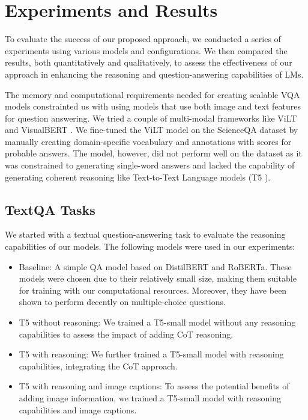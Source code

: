 \documentclass[10pt,twocolumn,letterpaper]{article}
\begin{document}
\section{Experiments and Results}
To evaluate the success of our proposed approach, we conducted a series of experiments using various models and configurations. We then compared the results, both quantitatively and qualitatively, to assess the effectiveness of our approach in enhancing the reasoning and question-answering capabilities of LMs.

The memory and computational requirements needed for creating scalable VQA models constrainted us with using models that use both image and text features for question answering. We tried a couple of multi-modal frameworks like ViLT \cite{huggingface2021vilt} and VisualBERT \cite{huggingface2021visualbert}. We fine-tuned the ViLT model on the ScienceQA dataset by manually creating domain-specific vocabulary and annotations with scores for probable answers. The model, however, did not perform well on the dataset as it was constrained to generating single-word answers and lacked the capability of generating coherent reasoning like Text-to-Text Language models (T5 \cite{huggingface2020t5}).

\subsection{TextQA Tasks}

We started with a textual question-answering task to evaluate the reasoning capabilities of our models. The following models were used in our experiments:
\begin{itemize}

\item Baseline: A simple QA model based on DistilBERT and RoBERTa. These models were chosen due to their relatively small size, making them suitable for training with our computational resources. Moreover, they have been shown to perform decently on multiple-choice questions.
  
\item T5 without reasoning: We trained a T5-small model without any reasoning capabilities to assess the impact of adding CoT reasoning.
  
\item T5 with reasoning: We further trained a T5-small model with reasoning capabilities, integrating the CoT approach.
  
\item T5 with reasoning and image captions: To assess the potential benefits of adding image information, we trained a T5-small model with reasoning capabilities and image captions.

\end{itemize}
\end{document}
